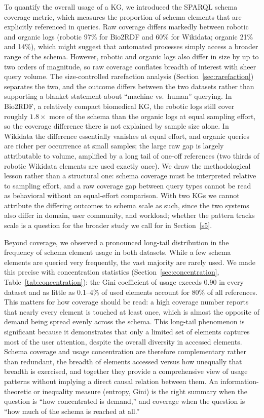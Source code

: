 \documentclass[sw]{iosart2x}
\begin{document}
To quantify the overall usage of a KG, we introduced the SPARQL schema coverage metric, which measures the proportion of schema elements that are explicitly referenced in queries. Raw coverage differs markedly between robotic and organic logs (robotic 97\% for Bio2RDF and 60\% for Wikidata; organic 21\% and 14\%), which might suggest that automated processes simply access a broader range of the schema. However, robotic and organic logs also differ in size by up to two orders of magnitude, so raw coverage conflates breadth of interest with sheer query volume. The size-controlled rarefaction analysis (Section~\ref{sec:rarefaction}) separates the two, and the outcome differs between the two datasets rather than supporting a blanket statement about ``machine vs.\ human'' querying. In Bio2RDF, a relatively compact biomedical KG, the robotic logs still cover roughly $1.8\times$ more of the schema than the organic logs at equal sampling effort, so the coverage difference there is not explained by sample size alone. In Wikidata the difference essentially vanishes at equal effort, and organic queries are richer per occurrence at small samples; the large raw gap is largely attributable to volume, amplified by a long tail of one-off references (two thirds of robotic Wikidata elements are used exactly once). We draw the methodological lesson rather than a structural one: schema coverage must be interpreted relative to sampling effort, and a raw coverage gap between query types cannot be read as behavioral without an equal-effort comparison. With two KGs we cannot attribute the differing outcomes to schema scale as such, since the two systems also differ in domain, user community, and workload; whether the pattern tracks scale is a question for the broader study we call for in Section~\ref{s5}.

Beyond coverage, we observed a pronounced long-tail distribution in the frequency of schema element usage in both datasets. While a few schema elements are queried very frequently, the vast majority are rarely used. We made this precise with concentration statistics (Section~\ref{sec:concentration}, Table~\ref{tab:concentration}): the Gini coefficient of usage exceeds 0.90 in every dataset and as little as 0.1--4\% of used elements account for 80\% of all references. This matters for how coverage should be read: a high coverage number reports that nearly every element is touched at least once, which is almost the opposite of demand being spread evenly across the schema. This long-tail phenomenon is significant because it demonstrates that only a limited set of elements captures most of the user attention, despite the overall diversity in accessed elements. Schema coverage and usage concentration are therefore complementary rather than redundant, the breadth of elements accessed versus how unequally that breadth is exercised, and together they provide a comprehensive view of usage patterns without implying a direct causal relation between them. An information-theoretic or inequality measure (entropy, Gini) is the right summary when the question is ``how concentrated is demand,'' and coverage when the question is ``how much of the schema is reached at all.''
\end{document}
